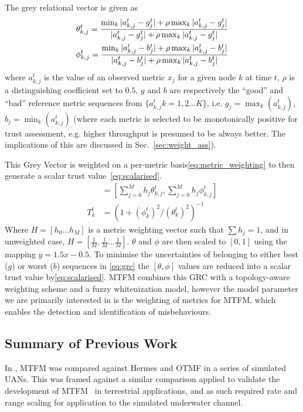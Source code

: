 \documentclass[conference]{IEEEtran}
\begin{document}
The grey relational vector is given as
%
\begin{align}
  \label{eq:grc}
  \theta_{k,j}^t = \frac{\min_k|a_{k,j}^t - g_j^t| + \rho \max_k|a_{k,j}^t-g_j^t|}{|a_{k,j}^t-g_j^t| + \rho \max_k|a_{k,j}^t-g_j^t|} \\
  \phi_{k,j}^t = \frac{\min_k|a_{k,j}^t - b_j^t| + \rho \max_k|a_{k,j}^t-b_j^t|}{|a_{k,j}^t-b_j^t| + \rho \max_k|a_{k,j}^t-b_j^t|} \notag 
\end{align}
%
where $a_{k,j}^t$ is the value of an observed metric $x_j$ for a given node $k$ at time $t$, $\rho$ is a distinguishing coefficient set to $0.5$, $g$ and $b$ are respectively the ``good'' and ``bad'' reference metric sequences from $\{a_{k,j}^t k=1,2\dots K\}$, i.e. $g_j=\max_k({a_{k,j}^t})$,  $b_j=\min_k({a_{k,j}^t})$ (where each metric is selected to be monotonically positive for trust assessment, e.g. higher throughput is presumed to be always better. The implications of this are discussed in Sec.~\ref{sec:weight_ass}). 

This Grey Vector is weighted on a per-metric basis\eqref{eq:metric_weighting} to then generate a scalar trust value~\eqref{eq:scalarised}. 
%
\begin{align}
  [\theta_k^t, \phi_k^t] &= \left[\sum_{j=0}^M h_j \theta_{k,j}^t,\sum_{j=0}^M h_j \phi_{k,j}^t \right] \label{eq:metric_weighting}\\
  T_k^t &= ({1+{(\phi_k^t)^2}/{(\theta_k^t)^2}})^{-1} \label{eq:scalarised}
\end{align}
%
Where $H=[h_0\dots h_M]$ is a metric weighting vector such that $\sum h_j = 1$, and in unweighted case, $H=[\frac{1}{M},\frac{1}{M}\dots\frac{1}{M}]$.
$\theta$ and $\phi$ are then scaled to $[0,1]$ using the mapping $y = 1.5 x - 0.5$.
To minimise the uncertainties of belonging to either best ($g$) or worst ($b$) sequences in \eqref{eq:grc} the $[\theta,\phi]$ values are reduced into a scalar trust value by\eqref{eq:scalarised}\cite{Hong2010}.
MTFM combines this GRC with a topology-aware weighting scheme and a fuzzy whitenization model, however the model parameter we are primarily interested in is the weighting of metrics for MTFM, which enables the detection and identification of misbehaviours.

\subsection{Summary of Previous Work}
In \cite{Bolster2015}, MTFM was compared against Hermes and OTMF in a series of simulated UANs. 
This was framed against a similar comparison applied to validate the development of MTFM~\cite{Guo2012} in terrestrial applications, and as such required rate and range scaling for application to the simulated underwater channel.
\end{document}
